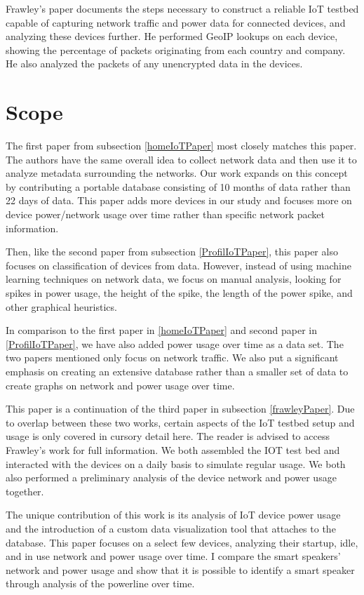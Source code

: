 Frawley's paper documents the steps necessary to construct a reliable IoT testbed capable of capturing network traffic and power data for connected devices, and analyzing these devices further. He performed GeoIP\cite{maxmind} lookups on each device, showing the percentage of packets originating from each country and company. He also analyzed the packets of any unencrypted data in the devices.

\section{Scope}
\label{Scope}
The first paper from subsection \ref{homeIoTPaper} most closely matches this paper. The authors have the same overall idea to collect network data and then use it to analyze metadata surrounding the networks. Our work expands on this concept by contributing a portable database consisting of 10 months of data rather than 22 days of data. This paper adds more devices in our study and focuses more on device power/network usage over time rather than specific network packet information.

Then, like the second paper from subsection \ref{ProfilIoTPaper}, this paper also focuses on classification of devices from data. However, instead of using machine learning techniques on network data, we focus on manual analysis, looking for spikes in power usage, the height of the spike, the length of the power spike, and other graphical heuristics.

In comparison to the first paper in \ref{homeIoTPaper} and second paper in \ref{ProfilIoTPaper}, we have also added power usage over time as a data set. The two papers mentioned only focus on network traffic. We also put a significant emphasis on creating an extensive database rather than a smaller set of data to create graphs on network and power usage over time.

This paper is a continuation of the third paper in subsection \ref{frawleyPaper}. Due to overlap between these two works, certain aspects of the IoT testbed setup and usage is only covered in cursory detail here. The reader is advised to access Frawley's work for full information. We both assembled the IOT test bed and interacted with the devices on a daily basis to simulate regular usage. We both also performed a preliminary analysis of the device network and power usage together.

The unique contribution of this work is its analysis of IoT device power usage and the introduction of a custom data visualization tool that attaches to the database. This paper focuses on a select few devices, analyzing their startup, idle, and in use network and power usage over time. I compare the smart speakers' network and power usage and show that it is possible to identify a smart speaker through analysis of the powerline over time.

